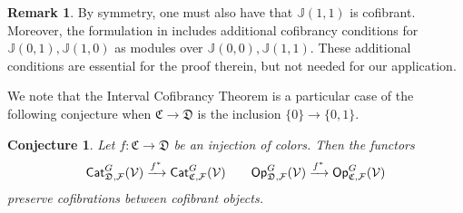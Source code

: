 \documentclass[a4paper,10pt
,draft
]{article}%
\numberwithin{equation}{section}
\numberwithin{figure}{section}
\newtheorem{conjecture}[equation]{Conjecture}%
\theoremstyle{definition} %
\newtheorem{remark}[equation]{Remark}%
\newcommand{\F}{\ensuremath{\mathcal F}}
\newcommand{\V}{\ensuremath{\mathcal V}}
\newcommand{\1}{\ensuremath{\mathbbm 1}}%
\begin{document}
\begin{remark}
By symmetry, one must also have that $\mathbb{J}(1,1)$ is cofibrant.
Moreover, the formulation in \cite[Thm. 1.15]{BM13}
includes additional cofibrancy conditions for
$\mathbb{J}(0,1),\mathbb{J}(1,0)$
as modules over $\mathbb{J}(0,0),\mathbb{J}(1,1)$.
These additional conditions are essential for the proof therein, 
but not needed for our application.
\end{remark}




We note that the Interval Cofibrancy Theorem is a particular case of the following conjecture when $\mathfrak{C} \to \mathfrak{D}$
is the inclusion $\{0\} \to \{0,1\}$.


\begin{conjecture}\label{CATOP CONJ}
Let $f \colon \mathfrak{C} \to \mathfrak{D}$
be an injection of colors.
Then the functors
\[
	\mathsf{Cat}_{\mathfrak{D},\F}^G(\V)
	\xrightarrow{f^{\**}}
	\mathsf{Cat}_{\mathfrak{C},\F}^G(\V)
\qquad
	\mathsf{Op}_{\mathfrak{D},\F}^G(\V)
	\xrightarrow{f^{\**}}
	\mathsf{Op}_{\mathfrak{C},\F}^G(\V)
\]
preserve cofibrations between cofibrant objects.
\end{conjecture}
\end{document}
